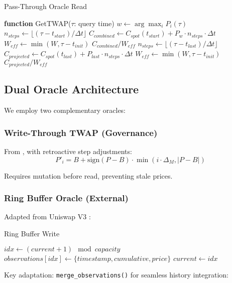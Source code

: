 \documentclass{article}
\begin{document}
\begin{algorithm}
\caption{Pass-Through Oracle Read}
\begin{algorithmic}
\STATE \textbf{function} GetTWAP($\tau$: query time)
    \STATE $w \gets \arg\max_i P_i(\tau)$ 
    \STATE $n_{steps} \gets \lfloor(\tau - t_{start}) / \Delta t\rfloor$
    \STATE $C_{combined} \gets C_{spot}(t_{start}) + P_w \cdot n_{steps} \cdot \Delta t$
    \STATE $W_{eff} \gets \min(W, \tau - t_{init})$
    \RETURN $C_{combined} / W_{eff}$
\ELSE
    \STATE $n_{steps} \gets \lfloor(\tau - t_{last}) / \Delta t\rfloor$
    \STATE $C_{projected} \gets C_{spot}(t_{last}) + P_{last} \cdot n_{steps} \cdot \Delta t$
    \STATE $W_{eff} \gets \min(W, \tau - t_{init})$
    \RETURN $C_{projected} / W_{eff}$
\ENDIF
\end{algorithmic}
\end{algorithm}

\subsection{Dual Oracle Architecture}

We employ two complementary oracles:

\subsubsection{Write-Through TWAP (Governance)}
From \cite{twap2025}, with retroactive step adjustments:
$$P'_i = B + \text{sign}(P-B) \cdot \min(i \cdot \Delta_M, |P-B|)$$

Requires mutation before read, preventing stale prices.

\subsubsection{Ring Buffer Oracle (External)}
Adapted from Uniswap V3 \cite{uniswapv3}:

\begin{algorithm}
\caption{Ring Buffer Write}
\begin{algorithmic}
\STATE $idx \gets (current + 1) \mod capacity$
\STATE $observations[idx] \gets \{timestamp, cumulative, price\}$
\STATE $current \gets idx$
\end{algorithmic}
\end{algorithm}

Key adaptation: \texttt{merge\_observations()} for seamless history integration:
\end{document}
